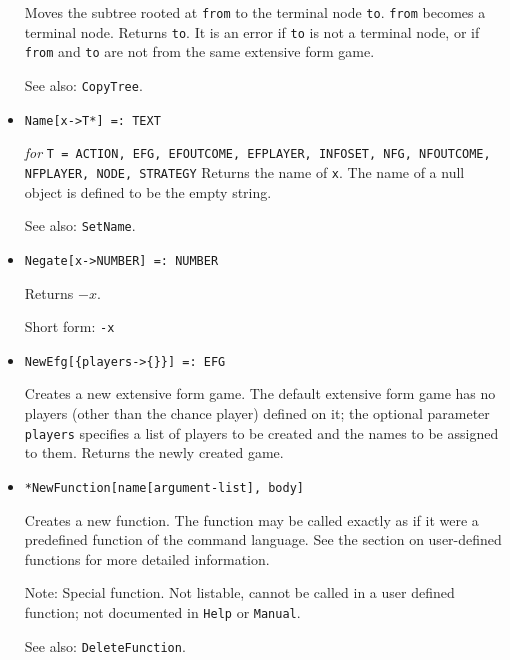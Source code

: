 \begin{itemize}
\bd
Moves the subtree rooted at \verb+from+ to
the terminal node \verb+to+.  \verb+from+ becomes a terminal node.
Returns \verb+to+.  It is an error if \verb+to+ is not a terminal
node, or if \verb+from+ and \verb+to+ are not from the same extensive
form game.
\item [See also:] \verb+CopyTree+.
\ed


\item{}
\protect \large \begin{verbatim}
Name[x->T*] =: TEXT
\end{verbatim}\normalsize

{\it for} {\tt T = ACTION, EFG, EFOUTCOME, EFPLAYER, INFOSET,
NFG, NFOUTCOME, NFPLAYER, NODE, STRATEGY} 
\bd
Returns the name of \verb+x+.  The name of a null object is defined
to be the empty string.
\item
[See also:] \verb+SetName+.
\ed

\item{} 
\protect \large \begin{verbatim}
Negate[x->NUMBER] =: NUMBER 
\end{verbatim} \normalsize

\bd
Returns $-x$.
\item
[Short form:] \verb+-x+
\ed

\item{}
\protect \large \begin{verbatim} 
NewEfg[{players->{}}] =: EFG 
\end{verbatim}\normalsize

\bd
Creates a new extensive form game.  The default extensive form
game has no players (other than the chance player) defined on it; the
optional parameter \verb+players+ specifies a list of players to be
created and the names to be assigned to them.  Returns the newly created game.
\ed

\item{}   
\protect \large \begin{verbatim}
*NewFunction[name[argument-list], body]
\end{verbatim}\normalsize

\bd
Creates a new function.  The function may be called exactly
as if it were a predefined function of the command language.  See the
section on user-defined functions for more detailed information.
\item [Note:]  Special function.  Not listable, cannot be called in a
user defined function; not documented in \verb+Help+ or \verb+Manual+.  
\item [See also:] \verb+DeleteFunction+.
\ed


\end{itemize}
